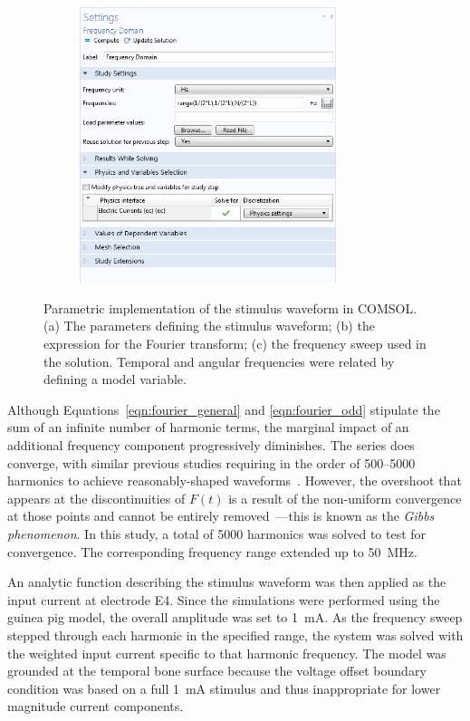 \begin{figure}[p]
\begin{subfigure}[t]{0.49\textwidth}
        \includegraphics[width=7.5cm]{Simulations/TimeDep/COMSOL_freqSol_crop}
        \caption{}
        \label{fig:COMSOL_freqSol}
    \end{subfigure}
    
	\caption[Parametric implementation of the stimulus waveform]{Parametric
	implementation of the stimulus waveform in COMSOL. (a) The parameters defining
	the stimulus waveform; (b) the expression for the Fourier transform; (c) the
	frequency sweep used in the solution. Temporal and angular frequencies were
	related by defining a model variable.}
	\label{fig:COMSOL_waveform}
\end{figure}

Although Equations~\ref{eqn:fourier_general} and \ref{eqn:fourier_odd} stipulate
the sum of an infinite number of harmonic terms, the marginal impact of an
additional frequency component progressively diminishes. The series does
converge, with similar previous studies requiring in the order of 500--5000
harmonics to achieve reasonably-shaped
waveforms~\cite{butson2005,bossetti2008,inguva2015ner}. However, the overshoot
that appears at the discontinuities of $ F(t) $ is a result of the non-uniform
convergence at those points and cannot be entirely
removed~\cite{kreyszig1988}---this is known as the \emph{Gibbs phenomenon}. In
this study, a total of 5000 harmonics was solved to test for convergence. The
corresponding frequency range extended up to 50~MHz.

An analytic function describing the stimulus waveform was then applied as the
input current at electrode E4. Since the simulations were performed using the
guinea pig model, the overall amplitude was set to 1~mA. As the frequency sweep
stepped through each harmonic in the specified range, the system was solved with
the weighted input current specific to that harmonic frequency. The model was
grounded at the temporal bone surface because the voltage offset boundary
condition was based on a full 1~mA stimulus and thus inappropriate for lower
magnitude current components.

